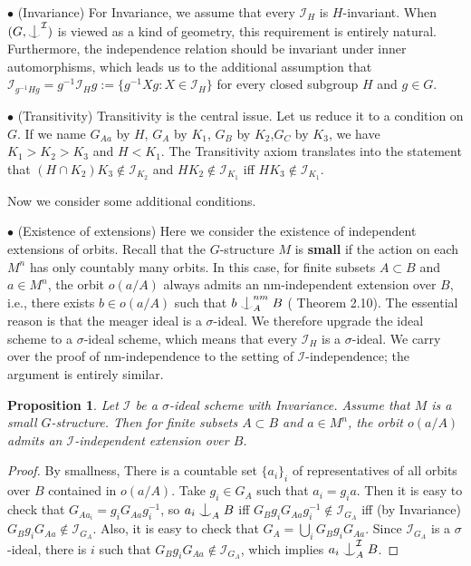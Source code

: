 \documentclass{article}
\newtheorem{prop}[definition]{Proposition}
\newcommand{\I}{\mathcal{I}}
\newcommand{\ind}{\mathrel{\raise0.2ex\hbox{\ooalign{\hidewidth$\vert$\hidewidth\cr\raise-0.9ex\hbox{$\smile$}}}}}
\begin{document}
$\bullet$ (Invariance) For Invariance, we assume that every $\I_H$ is $H$-invariant. When $(G, \ind^\I)$ is viewed as a kind of geometry, this requirement is entirely natural. Furthermore, the independence relation should be invariant under inner automorphisms, which leads us to the additional assumption that $\I_{g^{-1}Hg} = g^{-1} \I_H g:=\{g^{-1}Xg:X\in\I_H\}$ for every closed subgroup $H$ and $g\in G$.

$\bullet$ (Transitivity) Transitivity is the central issue. Let us reduce it to a condition on $G$. If we name $G_{Aa}$ by $H$, $G_A$ by $K_1$,
$G_B$ by $K_2$,$G_C$ by $K_3$, we have $K_1>K_2>K_3$ and $H<K_1$. The Transitivity axiom translates into the statement that $(H\cap K_2)K_3\notin \I_{K_2}$ and $H K_2\notin \I_{K_1}$ iff $HK_3\notin \I_{K_1}$.

Now we consider some additional conditions.

$\bullet$ (Existence of extensions) Here we consider the existence of independent extensions of orbits. Recall that the $G$-structure $M$ is \textbf{small} if the action on each $M^n$ has only countably many orbits. 
In this case, for finite subsets $A\subset B$ and $a\in M^n$, the orbit  $o(a/A)$ always admits an nm-independent extension over $B$, i.e., there exists $b\in o(a/A)$ such that $b\ind^{nm}_A B$ (\cite{KP} Theorem 2.10). The essential reason is that the meager ideal is a $\sigma$-ideal. We therefore upgrade the ideal scheme to a 
$\sigma$-ideal scheme, which means that every $\I_H$ is a $\sigma$-ideal. We carry over the proof of nm-independence to the setting of $\I$-independence; the argument is entirely similar.

\begin{prop}
Let $\I$ be a $\sigma$-ideal scheme with Invariance. Assume that $M$ is a small $G$-structure. Then for finite subsets $A\subset B$ and $a\in M^n$, the orbit  $o(a/A)$ admits an $\I$-independent extension over $B$. 
\end{prop}
\begin{proof}
By smallness, There is a countable set $\{a_i\}_i$ of representatives of all orbits over $B$ contained in $o(a/A)$. Take $g_i\in G_A$ such that $a_i=g_i a$. Then it is easy to check that $G_{Aa_i}=g_i G_{Aa} g_i^{-1}$, so $a_i\ind_A B$ iff $G_B g_iG_{Aa} g_i^{-1}\notin \I_{G_A}$ iff (by Invariance) $G_B g_iG_{Aa}\notin \I_{G_A}$. Also, it is easy to check that $G_A=\bigcup_i G_B g_i G_{Aa}$. Since $\I_{G_A}$ is a $\sigma$-ideal, there is $i$ such that $G_B g_iG_{Aa}\notin \I_{G_A}$, which implies $a_i\ind^\I_A B$.
\end{proof}
\end{document}
